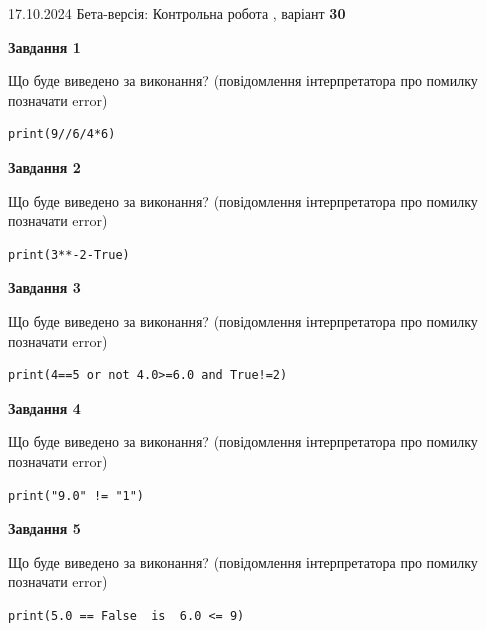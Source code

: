 \documentclass[12pt, ukrainian]{article}
\begin{document}
{\Large{17.10.2024 Бета-версія: Контрольна робота , варіант  \No \textbf { 30 }\par}}
{
\begin {large}
{\begin {center}\textbf{Завдання 1}\end {center}}

Що буде виведено за виконання? (повідомлення інтерпретатора про помилку позначати error)\par
\begin{verbatim}
print(9//6/4*6)
\end{verbatim}

{\begin {center}\textbf{Завдання 2}\end {center}}

Що буде виведено за виконання? (повідомлення інтерпретатора про помилку позначати error)\par
\begin{verbatim}
print(3**-2-True)
\end{verbatim}

{\begin {center}\textbf{Завдання 3}\end {center}}

Що буде виведено за виконання? (повідомлення інтерпретатора про помилку позначати error)\par
\begin{verbatim}
print(4==5 or not 4.0>=6.0 and True!=2)
\end{verbatim}

{\begin {center}\textbf{Завдання 4}\end {center}}

Що буде виведено за виконання? (повідомлення інтерпретатора про помилку позначати error)\par
\begin{verbatim}
print("9.0" != "1")
\end{verbatim}

{\begin {center}\textbf{Завдання 5}\end {center}}

Що буде виведено за виконання? (повідомлення інтерпретатора про помилку позначати error)\par
\begin{verbatim}
print(5.0 == False  is  6.0 <= 9)
\end{verbatim}


\end{large}}
\end{document}
